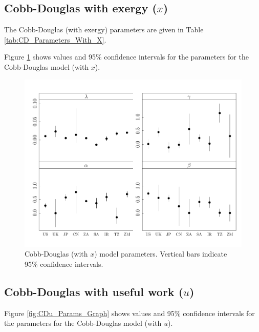 \documentclass[preprint,authoryear,12pt]{elsarticle}\usepackage{graphicx, color}
\makeatletter
\def\maxwidth{ %
  \ifdim\Gin@nat@width>\linewidth
    \linewidth
  \else
    \Gin@nat@width
  \fi
}
\newenvironment{knitrout}{}{} %
\makeatother
\begin{document}
\subsection{Cobb-Douglas with exergy ($x$)}

The Cobb-Douglas (with exergy) parameters are given in Table \ref{tab:CD_Parameters_With_X}.

Figure \ref{fig:CDx_Params_Graph} shows values and 95\% confidence intervals for the parameters for the Cobb-Douglas model (with $x$).

\begin{knitrout}
\color{fgcolor}\begin{figure}[H]

\includegraphics[width=\maxwidth]{figure/CDx_Params_Graph} \caption[Cobb-Douglas (with $x$) model parameters]{Cobb-Douglas (with $x$) model parameters. Vertical bars indicate 95\% confidence intervals.\label{fig:CDx_Params_Graph}}
\end{figure}


\end{knitrout}


\subsection{Cobb-Douglas with useful work ($u$)}

Figure \ref{fig:CDu_Params_Graph} shows values and 95\% confidence intervals for the parameters for the Cobb-Douglas model (with $u$).
\end{document}
